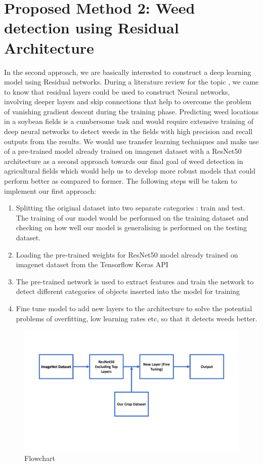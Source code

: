 \documentclass{report}
\begin{document}
\section{Proposed Method 2: Weed detection using Residual Architecture}

In the second approach, we are basically interested to construct a deep learning model using Residual networks. During a literature review for the topic \cite{ResnetArchi}, we came to know that residual layers could be used to construct Neural networks, involving deeper layers and skip connections that help to overcome the problem of vanishing gradient descent during the training phase. Predicting weed locations in a soybean fields is a cumbersome task and would require extensive training of deep neural networks to detect weeds in the fields with high precision and recall outputs from the results. We would use transfer learning techniques and make use of a pre-trained model already trained on imagenet dataset with a ResNet50 architecture as a second approach towards our final goal of weed detection in agricultural fields which would help us to develop more robust models that could perform better as compared to former. The following steps will be taken to implement our first approach:

\begin{enumerate}
	\item Splitting the original dataset into two separate categories : train and test. The training of our model would be performed on the training dataset and checking on how well our model is generalising is performed on the testing dataset. 
	\item Loading the pre-trained weights for ResNet50 model already trained on imagenet dataset from the Tensorflow Keras API
	\item The pre-trained network is used to extract features and train the network to detect different categories of objects inserted into the model for training 
	\item Fine tune model to add new layers to the architecture to solve the potential problems of overfitting, low learning rates etc, so that it detects weeds better.

\end{enumerate}
\begin{figure}[H]
\centering
\includegraphics[width=\textwidth]{pic1.pdf}
\caption{Flowchart}
\label{fig:Flowchart}
\end{figure}
\end{document}
